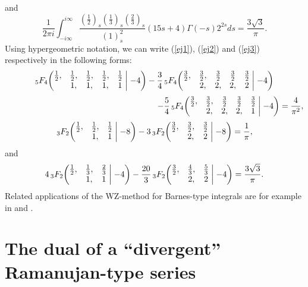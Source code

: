 \documentclass[12pt,a4paper]{amsart}
\begin{document}
and
\begin{equation}\label{ej3}
\frac{1}{2 \pi i} \int_{-i\infty}^{i\infty}  \frac{\left( \frac{1}{2} \right)_{\!s} \left( \frac{1}{3} \right)_{\!s} \left( \frac{2}{3} \right)_{\!s}}{\left(1\right)_{\!s}^2} (15s+4) \Gamma(-s)2^{2s}ds=\frac{3\sqrt{3}}{\pi}.
\end{equation}
Using hypergeometric notation, we can write (\ref{ej1}), (\ref{ej2}) and (\ref{ej3}) respectively in the following forms:
\[
{}_5F_4\biggl(\begin{matrix}
\frac12, & \frac12, & \frac12, & \frac12, & \frac12 \\
& 1, & 1, & 1, & 1 \end{matrix} \biggm| -4 \biggr)
-\frac{3}{4} \, {}_5F_4\biggl(\begin{matrix}
\frac32, & \frac32, & \frac32 & \frac32 & \frac32 \\
& 2, & 2, & 2, & 2  \end{matrix} \biggm| -4 \biggr)
\]
\[
\hskip 6.5cm -\frac{5}{4} \, {}_5F_4\biggl(\begin{matrix}
\frac32, & \frac32, & \frac32 & \frac32 & \frac32 \\
& 2, & 2, & 2, & 1  \end{matrix} \biggm| -4 \biggr)=\frac{4}{\pi^2},
\]
\[
{}_3F_2\biggl(\begin{matrix}
\frac12, & \frac12, & \frac12 \\
& 1, & 1 \end{matrix} \biggm| -8 \biggr)-
3 \, {}_3F_2\biggl(\begin{matrix}
\frac32, & \frac32, & \frac32 \\
& 2, & 2 \end{matrix} \biggm| -8 \biggr)=\frac{1}{\pi},
\]
and
\[
4 \, {}_3F_2\biggl(\begin{matrix}
\frac12, & \frac13, & \frac23 \\
& 1, & 1 \end{matrix} \biggm| -4 \biggr)-\frac{20}{3} \,
{}_3F_2\biggl(\begin{matrix}
\frac32, & \frac43, & \frac53 \\
& 2, & 2 \end{matrix} \biggm| -4 \biggr)=\frac{3\sqrt{3}}{\pi}.
\]
Related applications of the WZ-method for Barnes-type integrals are for example in \cite[Sect. 5.2]{bailey-ising} and \cite{stan}.

\section{The dual of a ``divergent'' Ramanujan-type series}
\end{document}

